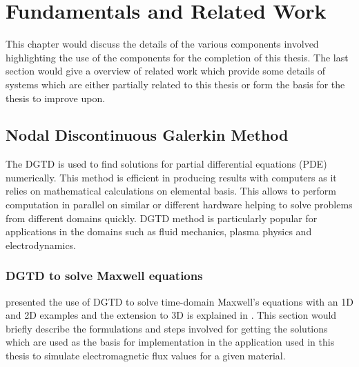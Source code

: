 \chapter{Fundamentals and Related Work}
\label{cha:Fundamentals}

This chapter would discuss the details of the various components involved highlighting
the use of the components for the completion of this thesis. The last section
would give a overview of related work which provide some details of systems which
are either partially related to this thesis or form the basis for the thesis to improve
upon.

\section{Nodal Discontinuous Galerkin Method}
\label{sec:dgtd}

The \ac{DGTD} \cite{hesthaven_nodal_2008} is used to find solutions
for partial differential equations (PDE) numerically. This method is efficient in
producing results with computers as it relies on mathematical calculations on elemental basis.
This allows to perform computation in parallel on similar or different hardware helping to
solve problems from different domains quickly. \ac{DGTD} method is particularly popular for applications
in the domains such as fluid mechanics, plasma physics and electrodynamics.

\subsection{DGTD to solve Maxwell equations}
\label{sec:dgtd_maxwell}

\textcite{Hesthaven_190449} presented the use of \ac{DGTD} to solve time-domain Maxwell's equations with
an 1D and 2D examples and the extension to 3D is explained in \cite{hesthaven_nodal_2008}. This section
would briefly describe the formulations and steps involved for getting the solutions which are
used as the basis for implementation in the application used in this thesis to simulate
electromagnetic flux values for a given material.

